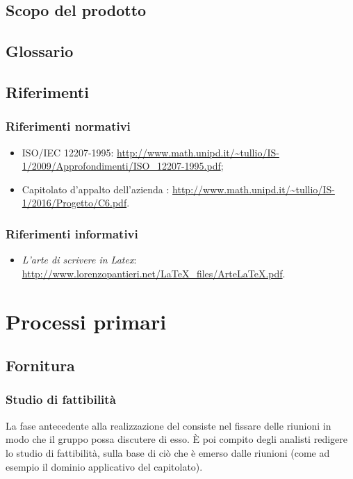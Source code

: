 \subsection{Scopo del prodotto}
\scopo

\subsection{Glossario}
\presgloss

\subsection{Riferimenti}

\subsubsection{Riferimenti normativi}
\begin{itemize}
	\item ISO/IEC 12207-1995: \url{http://www.math.unipd.it/\~tullio/IS-1/2009/Approfondimenti/ISO_12207-1995.pdf};
	\item Capitolato d'appalto dell'azienda \ZU: \url{http://www.math.unipd.it/~tullio/IS-1/2016/Progetto/C6.pdf}. %
\end{itemize}

\subsubsection{Riferimenti informativi}
\begin{itemize}
	\item \emph{L'arte di scrivere in Latex}: \url{http://www.lorenzopantieri.net/LaTeX_files/ArteLaTeX.pdf}.
\end{itemize}




\section{Processi primari} \label{sec:primari}

\subsection{Fornitura}

	\subsubsection{Studio di fattibilità}
	La fase antecedente alla realizzazione del  consiste nel fissare delle riunioni in modo che il gruppo possa discutere di esso. È poi compito degli analisti redigere lo studio di fattibilità, sulla base di ciò che è emerso dalle riunioni (come ad esempio il dominio applicativo del capitolato).

